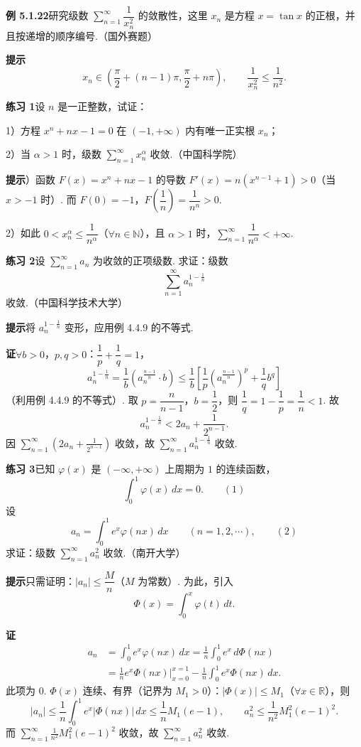 \documentclass[UTF8, 12pt, fontset=fandol, oneside]{ctexart}
\begin{document}
\noindent\textbf{例 5.1.22}\quad 研究级数 $\displaystyle\sum_{n=1}^\infty\dfrac1{x_n^2}$ 的敛散性，这里 $x_n$ 是方程 $x=\tan x$ 的正根，并且按递增的顺序编号.（国外赛题）

\noindent\textbf{提示}\quad
\[
  x_n\in\left(\frac\pi2+(n-1)\pi,\frac\pi2+n\pi\right),\qquad
  \frac1{x_n^2}\le\frac1{n^2}.
\]

\noindent\textbf{练习 1}\quad 设 $n$ 是一正整数，试证：

1）方程 $x^n+nx-1=0$ 在 $(-1,+\infty)$ 内有唯一正实根 $x_n$；

2）当 $\alpha>1$ 时，级数 $\displaystyle\sum_{n=1}^\infty x_n^\alpha$ 收敛.（中国科学院）

\noindent\textbf{提示}）函数 $F(x)=x^n+nx-1$ 的导数 $F'(x)=n(x^{n-1}+1)>0$（当 $x>-1$ 时）. 而 $F(0)=-1$，$F\left(\dfrac1n\right)=\dfrac1{n^n}>0$.

2）如此 $0<x_n^\alpha\le\dfrac1{n^\alpha}$（$\forall n\in\mathbb{N}$），且 $\alpha>1$ 时，$\displaystyle\sum_{n=1}^\infty\dfrac1{n^\alpha}<+\infty$.

\noindent\textbf{练习 2}\quad 设 $\displaystyle\sum_{n=1}^\infty a_n$ 为收敛的正项级数. 求证：级数
\[
  \sum_{n=1}^\infty a_n^{1-\frac1n}
\]
收敛.（中国科学技术大学）

\noindent\textbf{提示}\quad 将 $a_n^{1-\frac1n}$ 变形，应用例 4.4.9 的不等式.

\noindent\textbf{证}\quad $\forall b>0$，$p,q>0$：$\dfrac1p+\dfrac1q=1$，
\[
  a_n^{1-\frac1n}=\frac1b(a_n^{\frac{n-1}n}\cdot b)
  \le\frac1b\left[\frac1p(a_n^{\frac{n-1}n})^p+\frac1q b^q\right]
\]
（利用例 4.4.9 的不等式）. 取 $p=\dfrac n{n-1}$，$b=\dfrac12$，则 $\dfrac1q=1-\dfrac1p=\dfrac1n<1$. 故
\[
  a_n^{1-\frac1n}<2a_n+\frac1{2^{n-1}}.
\]
因 $\displaystyle\sum_{n=1}^\infty\left(2a_n+\frac1{2^{n-1}}\right)$ 收敛，故 $\displaystyle\sum_{n=1}^\infty a_n^{1-\frac1n}$ 收敛.

\noindent\textbf{练习 3}\quad 已知 $\varphi(x)$ 是 $(-\infty,+\infty)$ 上周期为 $1$ 的连续函数，
\[
  \int_0^1\varphi(x)\,dx=0.
\qquad(1)
\]
设
\[
  a_n=\int_0^1 e^x\varphi(nx)\,dx\qquad(n=1,2,\cdots),
\qquad(2)
\]
求证：级数 $\displaystyle\sum_{n=1}^\infty a_n^2$ 收敛.（南开大学）

\noindent\textbf{提示}\quad 只需证明：$|a_n|\le\dfrac Mn$（$M$ 为常数）. 为此，引入
\[
  \Phi(x)=\int_0^x\varphi(t)\,dt.
\]

\noindent\textbf{证}\quad
\[
\begin{aligned}
a_n
&=\int_0^1 e^x\varphi(nx)\,dx
=\frac1n\int_0^1 e^x\,d\Phi(nx)\\
&=\frac1n e^x\Phi(nx)\bigg|_{x=0}^{x=1}
  -\frac1n\int_0^1 e^x\Phi(nx)\,dx.
\end{aligned}
\]
此项为 $0$. $\Phi(x)$ 连续、有界（记界为 $M_1>0$）：$|\Phi(x)|\le M_1$（$\forall x\in\mathbb{R}$），则
\[
  |a_n|\le\frac1n\int_0^1e^x|\Phi(nx)|\,dx
  \le\frac1nM_1(e-1),
\qquad
  a_n^2\le\frac1{n^2}M_1^2(e-1)^2.
\]
而 $\displaystyle\sum_{n=1}^\infty\frac1{n^2}M_1^2(e-1)^2$ 收敛，故 $\displaystyle\sum_{n=1}^\infty a_n^2$ 收敛.
\end{document}
